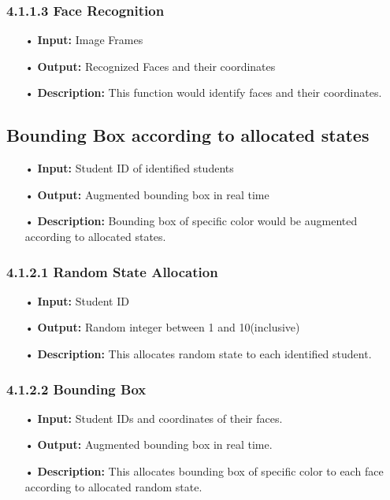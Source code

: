 \subsubsection{4.1.1.3 Face Recognition}
\begin{enumerate}
\item[•] \textbf{Input:} Image Frames
\item[•] \textbf{Output:} Recognized Faces and their coordinates
\item[•] \textbf{Description:} This function would identify faces and their coordinates.
\end{enumerate}

\subsection{Bounding Box according to allocated states}
\begin{enumerate}
\item[•] \textbf{Input:} Student ID of identified students
\item[•] \textbf{Output:} Augmented bounding box in real time
\item[•] \textbf{Description:} Bounding box of specific color would be augmented according to allocated states.
\end{enumerate}

\subsubsection{4.1.2.1 Random State Allocation}
\begin{enumerate}
\item[•] \textbf{Input:} Student ID
\item[•] \textbf{Output:} Random integer between 1 and 10(inclusive)
\item[•] \textbf{Description:} This allocates random state to each identified student.
\end{enumerate}

\subsubsection{4.1.2.2 Bounding Box}
\begin{enumerate}
\item[•] \textbf{Input:} Student IDs and coordinates of their faces.
\item[•] \textbf{Output:} Augmented bounding box in real time.
\item[•] \textbf{Description:} This allocates bounding box of specific color to each face according to allocated random state.
\end{enumerate}

